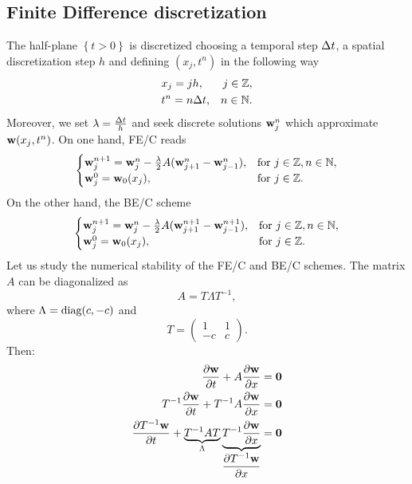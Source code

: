 \subsection{Finite Difference discretization}
The half-plane \(\left\{ t>0 \right\}\) is discretized choosing a temporal step \(\Delta t\), a spatial discretization step \(h\) and defining \((x_j, t^n)\) in the following way 
\begin{align*}
    &x_j = jh,  &j \in \mathbb{Z},    &\\
    &t^n = n\Delta t, & n\in \mathbb{N}.&
\end{align*}
Moreover, we set \(\lambda =  \frac{\Delta t}{h}\) and seek discrete solutions \(\textbf{w}^n_j\) which approximate \(\textbf{w}(x_j, t^n)\). On one hand, FE/C reads
\begin{equation}
    \begin{cases}
        \textbf{w}^{n+1}_j = \textbf{w}^n_j -\frac{\lambda}{2} A(\textbf{w}^n_{j+1} - \textbf{w}^n_{j-1}), & \text{for } j \in \mathbb{Z}, n \in \mathbb{N}, \\
        \textbf{w}^0_j = \textbf{w}_0(x_j), & \text{for } j \in \mathbb{Z}.
    \end{cases}
    \label{25_hyp}
\end{equation} 
On the other hand, the BE/C scheme
\begin{equation}
    \begin{cases}
        \textbf{w}^{n+1}_j = \textbf{w}^n_j -\frac{\lambda}{2} A(\textbf{w}^{n+1}_{j+1} - \textbf{w}^{n+1}_{j-1}), & \text{for } j \in \mathbb{Z}, n \in \mathbb{N}, \\
        \textbf{w}^0_j = \textbf{w}_0(x_j), & \text{for } j \in \mathbb{Z}.
    \end{cases}
    \label{26_hyp}
\end{equation}
Let us study the numerical stability of the FE/C and BE/C schemes. The matrix \(A\) can be diagonalized as 
\[
    A = T\Lambda T^{-1},
\]
where \(\Lambda = \text{diag}(c,-c)\) and 
\[
    T = \left( \begin{matrix}
        1 & 1 \\
        -c & c 
    \end{matrix} \right).
\]
Then: 
\begin{align*}
    \partialderivative{\vect{w}}{t} + A \partialderivative{\vect{w}}{x} &= \vect{0} \\
    T^{-1} \partialderivative{\vect{w}}{t} + T^{-1} A \partialderivative{\vect{w}}{x} &= \vect{0} \\ 
    \partialderivative{T^{-1}\vect{w}}{t} + \underbrace{T^{-1} A T}_{\Lambda} \underbrace{T^{-1}\partialderivative{\vect{w}}{x}}_{\displaystyle \partialderivative{T^{-1} \vect{w}}{x}} &= \vect{0} 
\end{align*}
